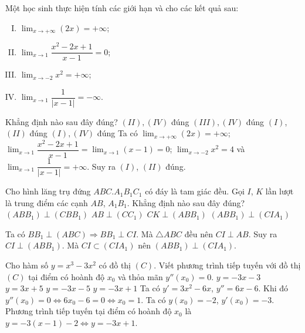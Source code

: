 \begin{ex}%
 Một học sinh thực hiện tính các giới hạn và cho các kết quả sau:
 \begin{enumerate}[(I)]
\item $\displaystyle\lim_{x\to +\infty}(2x)=+\infty$;
\item $\displaystyle\lim_{x\to 1}\dfrac{x^2-2x+1}{x-1}=0$;
\item $\displaystyle\lim_{x\to -2}x^2=+\infty$;
\item $\displaystyle\lim_{x\to 1}\dfrac{1}{|x-1|}=-\infty$.
\end{enumerate}
Khẳng định nào sau đây đúng?
\choice
{$(II), (IV)$ đúng}
{$(III), (IV)$ đúng}
{\True $(I)$, $(II)$ đúng}
{$(I), (IV)$ đúng}
\loigiai
{Ta có $\displaystyle\lim_{x\to +\infty}(2x)=+\infty$; $\displaystyle\lim_{x\to 1}\dfrac{x^2-2x+1}{x-1}=\displaystyle\lim_{x\to 1}(x-1)=0$; $\displaystyle\lim_{x\to -2}x^2=4$ và $\displaystyle\lim_{x\to 1}\dfrac{1}{|x-1|}=+\infty$. Suy ra $(I)$, $(II)$ đúng.
}
\end{ex}

\begin{ex}%
 Cho hình lăng trụ đứng $ABC.A_1B_1C_1$ có đáy là tam giác đều. Gọi $I$, $K$ lần lượt là trung điểm các cạnh $AB$, $A_1B_1$.
Khẳng định nào sau đây đúng?
\choice
{$(ABB_1)\perp (CBB_1)$}
{$AB\perp (CC_1)$}
{$CK\perp (ABB_1)$}
{\True $(ABB_1)\perp (CIA_1)$}
\loigiai
{
\immini
{Ta có $BB_1\perp (ABC)\Rightarrow BB_1\perp CI$. Mà $\triangle ABC$ đều nên $CI\perp AB$. Suy ra $CI\perp (ABB_1)$. Mà $CI\subset (CIA_1)$ nên $(ABB_1)\perp (CIA_1)$.
}
{
}
}
\end{ex}

\begin{ex}%
 Cho hàm số $y=x^3-3x^2$ có đồ thị $(C)$. Viết phương trình tiếp tuyến với đồ thị $(C)$ tại điểm có hoành độ $x_0$ và thỏa mãn $y''(x_0)=0$.
\choice
{$y=-3x-3$}
{$y=3x+5$}
{$y=-3x-5$}
{\True $y=-3x+1$}
\loigiai
{Ta có $y'=3x^2-6x$, $y''=6x-6$. Khi đó $y''(x_0)=0\Leftrightarrow 6x_0-6=0\Leftrightarrow x_0=1$. Ta có $y(x_0)=-2$, $y'(x_0)=-3$. Phương trình tiếp tuyến tại điểm có hoành độ $x_0$ là $y=-3(x-1)-2\Leftrightarrow y=-3x+1$.
}
\end{ex}

